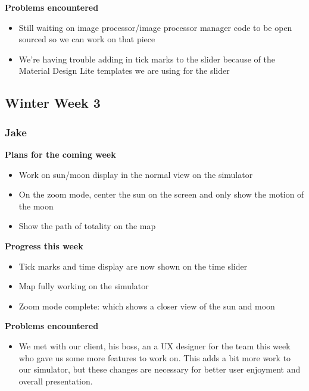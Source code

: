 \documentclass[10pt, onecolumn, draftclsnofoot, letterpaper, compsoc]{IEEEtran}
\begin{document}
    \noindent \textbf{Problems encountered}

    \begin{itemize}

    \item Still waiting on image processor/image processor manager code to be open sourced so we can work on that piece
    \item We're having trouble adding in tick marks to the slider because of the Material Design Lite templates we are using for the slider

    \end{itemize}

\subsection{Winter Week 3}

    \subsubsection{Jake}

    \noindent \textbf{Plans for the coming week}

    \begin{itemize}

    \item Work on sun/moon display in the normal view on the simulator
    \item On the zoom mode, center the sun on the screen and only show the motion of the moon
    \item Show the path of totality on the map

    \end{itemize}

    \noindent \textbf{Progress this week}

    \begin{itemize}

    \item Tick marks and time display are now shown on the time slider
    \item Map fully working on the simulator
    \item Zoom mode complete: which shows a closer view of the sun and moon

    \end{itemize}

    \noindent \textbf{Problems encountered}

    \begin{itemize}

    \item We met with our client, his boss, an a UX designer for the team this week
    who gave us some more features to work on. This adds a bit more work to our simulator,
    but these changes are necessary for better user enjoyment and overall presentation.

    \end{itemize}
\end{document}
